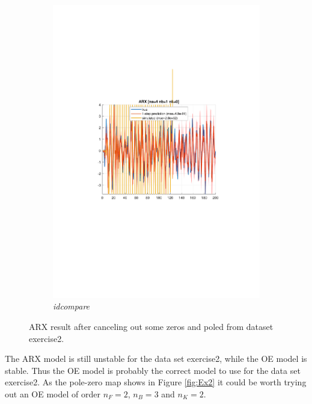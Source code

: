 \documentclass[]{article}
\begin{document}
\begin{figure}[ht]
\begin{subfigure}{.49\textwidth}
	\includegraphics[trim= 10cm 8cm 10cm 8cm, scale=0.4]{figures/3-ARX-Ex2-idcompare-cancel_out.pdf}
	\caption{\emph{idcompare}}
\end{subfigure}
\caption{ARX result after canceling out some zeros and poled from dataset exercise2.}
\label{fig:Ex2-ARX-cancel}
\end{figure}
The ARX model is still unstable for the data set exercise2, while the OE model is stable. Thus the OE model is probably the correct model to use for the data set exercise2. As the pole-zero map shows in Figure \ref{fig:Ex2} it could be worth trying out an OE model of order $n_F = 2$, $n_B = 3$ and $n_K = 2$.
\end{document}
